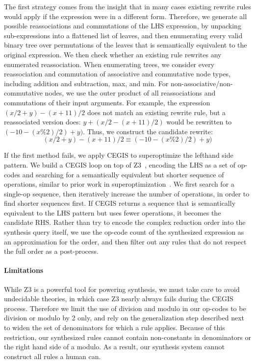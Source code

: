 \documentclass[sigplan,10pt,review,anonymous]{acmart}\settopmatter{printfolios=true,printccs=false,printacmref=false}
\begin{document}
The first strategy comes from the insight that in many cases existing rewrite rules would apply
if the expression were in a different form.  Therefore, we generate all possible
reassociations and commutations of the LHS expression, by unpacking sub-expressions
into a flattened list of leaves, and then enumerating every valid binary
tree over permutations of the leaves that is semantically equivalent to the original
expression.  We then check whether an existing rule rewrites any enumerated reassociation.
When enumerating trees, we consider every reassociation and commutation
of associative and commutative node types, including addition and subtraction, max, and
min.  For non-associative/non-commutative nodes, we use the outer product of all reassociations
and commutations of their input arguments.  For example, the expression $(x/2 + y) - (x + 11)/2$
does not match an existing rewrite rule, but a reassociated version does: $y + (x/2 - (x + 11)/2)$
would be rewritten to $(-10 - (x \% 2)/2) + y)$.  Thus, we construct the candidate rewrite:
$$(x/2 + y) - (x + 11)/2 \equiv (-10 - (x \% 2)/2) + y)$$

If the first method fails, we apply CEGIS to superoptimize the lefthand side pattern.
We build a CEGIS loop on top of Z3~\cite{de2008z3}, encoding the LHS as a set of op-codes
and searching for a semantically equivalent but shorter sequence of operations, similar
to prior work in superoptimization~\cite{regehr2018superoptimization, mangpo2016superoptimization}.
We first search for a single-op sequence,
then iteratively increase the number of operations, in order to find shorter sequences
first.  If CEGIS returns a sequence that is semantically equivalent to the LHS pattern but uses fewer
operations, it becomes the candidate RHS. Rather than try to encode the complex reduction order into the synthesis query itself, we use the op-code count of the synthesized expression as an approximation for the order, and then filter out any rules that do not respect the full order as a post-process. 

\paragraph{Limitations} While Z3 is a powerful tool for powering synthesis, we must take care to avoid
undecidable theories, in which case Z3 nearly always fails during the CEGIS process.
Therefore we limit the use of division and modulo in our op-codes to be division
or modulo by 2 only, and rely on the generalization step described next to
widen the set of denominators for which a rule applies.  Because of this
restriction, our synthesized rules cannot contain non-constants in denominators
or the right hand side of a modulo.  As a result, our synthesis system cannot
construct all rules a human can.
\end{document}
